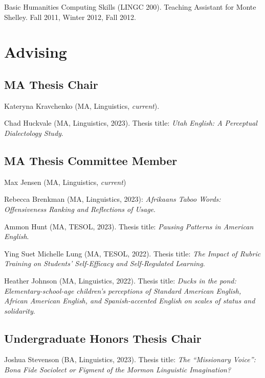 \documentclass[
]{article}
\begin{document}
Basic Humanities Computing Skills (LINGC 200). Teaching Assistant for
Monte Shelley. Fall 2011, Winter 2012, Fall 2012.

\hypertarget{advising}{%
\section{Advising}\label{advising}}

\hypertarget{ma-thesis-chair}{%
\subsection{MA Thesis Chair}\label{ma-thesis-chair}}

Kateryna Kravchenko (MA, Linguistics, \emph{current}).

Chad Huckvale (MA, Linguistics, 2023). Thesis title: \emph{Utah English:
A Perceptual Dialectology Study}.

\hypertarget{ma-thesis-committee-member}{%
\subsection{MA Thesis Committee
Member}\label{ma-thesis-committee-member}}

Max Jensen (MA, Linguistics, \emph{current})

Rebecca Brenkman (MA, Linguistics, 2023): \emph{Afrikaans Taboo Words:
Offensiveness Ranking and Reflections of Usage}.

Ammon Hunt (MA, TESOL, 2023). Thesis title: \emph{Pausing Patterns in
American English}.

Ying Suet Michelle Lung (MA, TESOL, 2022). Thesis title: \emph{The
Impact of Rubric Training on Students' Self-Efficacy and Self-Regulated
Learning}.

Heather Johnson (MA, Linguistics, 2022). Thesis title: \emph{Ducks in
the pond: Elementary-school-age children's perceptions of Standard
American English, African American English, and Spanish-accented English
on scales of status and solidarity}.

\hypertarget{undergraduate-honors-thesis-chair}{%
\subsection{Undergraduate Honors Thesis
Chair}\label{undergraduate-honors-thesis-chair}}

Joshua Stevenson (BA, Linguistics, 2023). Thesis title: \emph{The
``Missionary Voice'': Bona Fide Sociolect or Figment of the Mormon
Linguistic Imagination?}
\end{document}

